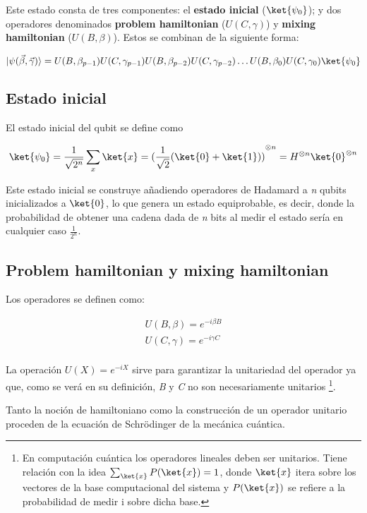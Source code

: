 Este estado consta de tres componentes: el \textbf{estado inicial} ($\ket{\psi_0}$); y dos operadores denominados \textbf{problem hamiltonian} ($U(C, \gamma)$) y \textbf{mixing hamiltonian} ($U(B, \beta)$).
Estos se combinan de la siguiente forma:

\[
  \lvert\psi(\vec{\beta}, \vec{\gamma})\rangle = U(B, \beta_{p-1})U(C, \gamma_{p-1})U(B, \beta_{p-2})U(C, \gamma_{p-2}) \ldots U(B, \beta_0)U(C, \gamma_0) \ket{\psi_0}
\]

\subsection{Estado inicial}
El estado inicial del qubit se define como

\begin{align*}
  \ket{\psi_0} = \frac{1}{\sqrt{2^n}} \sum_x\ket{x}
  = {(\frac{1}{\sqrt{2}} (\ket{0} + \ket{1}))}^{\otimes n}
  = H^{\otimes n} \ket{0}^{\otimes n}
\end{align*}

Este estado inicial se construye añadiendo operadores de Hadamard a \textit{n} qubits inicializados a $\ket{0}$, lo que genera un estado equiprobable, es decir, donde la probabilidad de obtener una cadena dada de \textit{n} bits al medir el estado sería en cualquier caso $\frac{1}{2^n}$.

\subsection{Problem hamiltonian y mixing hamiltonian\label{sec:3-problem_y_mixing_hamiltonian}}

Los operadores se definen como:

\begin{align*}
  U(B, \beta) = e^{-i \beta B} \\
  U(C, \gamma) = e^{-i \gamma C} \\
\end{align*}

La operación \(U(X) = e^{-i X}\) sirve para garantizar la unitariedad del operador ya que, como se verá en su definición, \textit{B} y \textit{C} no son necesariamente unitarios
\footnote{En computación cuántica los operadores lineales deben ser unitarios. Tiene relación con la idea
  $\sum_{\ket{x}} {P(\ket{x})} = 1$,
  donde $\ket{x}$ itera sobre los vectores de la base computacional del sistema y
  \(P(\ket{x})\) se refiere a la probabilidad de medir i sobre dicha base.}.

Tanto la noción de hamiltoniano como la construcción de un operador unitario proceden de la ecuación de Schrödinger de la mecánica cuántica.


